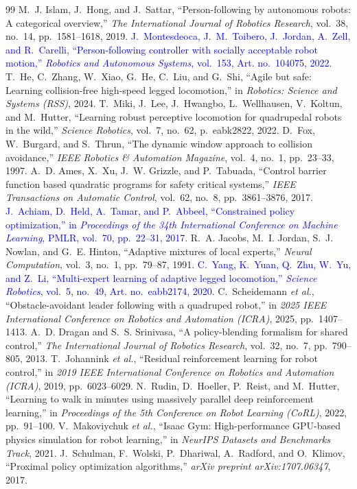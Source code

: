 \documentclass[letterpaper, 10 pt, conference]{ieeeconf}
\newcommand{\rev}[1]{\textcolor{blue}{#1}}
\begin{document}
\FloatBarrier
\begin{thebibliography}{99}
\setlength{\itemsep}{-1.2pt}
 M.~J. Islam, J.~Hong, and J.~Sattar,
``Person-following by autonomous robots: A categorical overview,'' \emph{The
International Journal of Robotics Research}, vol.~38, no.~14, pp.~1581--1618,
2019.
 \rev{J.~Montesdeoca, J.~M.~Toibero, J.~Jordan, A.~Zell, and R.~Carelli,
``Person-following controller with socially acceptable robot motion,''
\emph{Robotics and Autonomous Systems}, vol.~153, Art. no.~104075, 2022.}
 T.~He, C.~Zhang, W.~Xiao, G.~He, C.~Liu, and G.~Shi,
``Agile but safe: Learning collision-free high-speed legged locomotion,'' in
\emph{Robotics: Science and Systems (RSS)}, 2024.
 T.~Miki, J.~Lee, J.~Hwangbo, L.~Wellhausen, V.~Koltun,
and M.~Hutter, ``Learning robust perceptive locomotion for quadrupedal
robots in the wild,'' \emph{Science Robotics}, vol.~7, no.~62, p.~eabk2822,
2022.
 D.~Fox, W.~Burgard, and S.~Thrun, ``The dynamic window
approach to collision avoidance,'' \emph{IEEE Robotics \& Automation
Magazine}, vol.~4, no.~1, pp.~23--33, 1997.
 A.~D. Ames, X.~Xu, J.~W. Grizzle, and P.~Tabuada,
``Control barrier function based quadratic programs for safety critical
systems,'' \emph{IEEE Transactions on Automatic Control}, vol.~62, no.~8,
pp.~3861--3876, 2017.
 \rev{J.~Achiam, D.~Held, A.~Tamar, and P.~Abbeel,
``Constrained policy optimization,'' in \emph{Proceedings of the 34th
International Conference on Machine Learning}, PMLR, vol.~70, pp.~22--31,
2017.}
 R.~A. Jacobs, M.~I. Jordan, S.~J. Nowlan, and
G.~E. Hinton, ``Adaptive mixtures of local experts,'' \emph{Neural
Computation}, vol.~3, no.~1, pp.~79--87, 1991.
 \rev{C.~Yang, K.~Yuan, Q.~Zhu, W.~Yu, and Z.~Li,
``Multi-expert learning of adaptive legged locomotion,''
\emph{Science Robotics}, vol.~5, no.~49, Art. no.~eabb2174, 2020.}
 C.~Scheidemann \emph{et al.},
``Obstacle-avoidant leader following with a quadruped robot,'' in
\emph{2025 IEEE International Conference on Robotics and Automation (ICRA)},
2025, pp.~1407--1413.
 A.~D. Dragan and S.~S. Srinivasa, ``A
policy-blending formalism for shared control,'' \emph{The International
Journal of Robotics Research}, vol.~32, no.~7, pp.~790--805, 2013.
 T.~Johannink \emph{et al.}, ``Residual reinforcement
learning for robot control,'' in \emph{2019 IEEE International Conference on
Robotics and Automation (ICRA)}, 2019, pp.~6023--6029.
 N.~Rudin, D.~Hoeller, P.~Reist, and M.~Hutter,
``Learning to walk in minutes using massively parallel deep reinforcement
learning,'' in \emph{Proceedings of the 5th Conference on Robot Learning
(CoRL)}, 2022, pp.~91--100.
 V.~Makoviychuk \emph{et al.}, ``Isaac Gym:
High-performance GPU-based physics simulation for robot learning,'' in
\emph{NeurIPS Datasets and Benchmarks Track}, 2021.
 J.~Schulman, F.~Wolski, P.~Dhariwal, A.~Radford, and
O.~Klimov, ``Proximal policy optimization algorithms,'' \emph{arXiv
preprint arXiv:1707.06347}, 2017.
\end{thebibliography}
\end{document}
